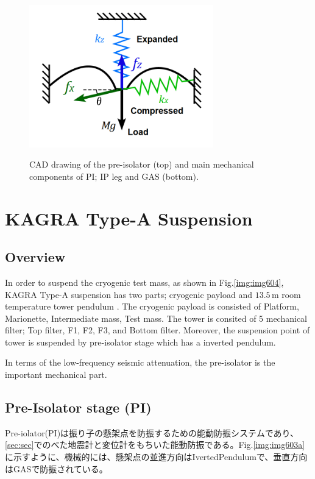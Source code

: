 \begin{figure}[p]
\begin{minipage}[b]{0.5\hsize}
\begin{center}
      \label{img:img603b}
    \end{center}
  \end{minipage}
  \begin{minipage}[b]{0.5\hsize}
    \begin{center}
      \includegraphics[width=8cm]{./img_chap6/img603c.png}
      \label{img:img603b}
    \end{center}
  \end{minipage}  
  \caption{CAD drawing of the pre-isolator (top) and main mechanical components of PI; IP leg and GAS (bottom).}
\end{figure}


\section{KAGRA Type-A Suspension}
\subsection{Overview}
In order to suspend the cryogenic test mass, as shown in Fig.\ref{img:img604}, KAGRA Type-A suspension has two parts; cryogenic payload and $13.5\,\mathrm{m}$ room temperature tower pendulum \cite{Okutomi2019development}. The cryogenic payload is consisted of Platform, Marionette, Intermediate mass, Test mass. The tower is consited of 5 mechanical filter; Top filter, F1, F2, F3, and Bottom filter. Moreover, the suspension point of tower is suspended by pre-isolator stage which has a inverted pendulum.

In terms of the low-frequency seismic attenuation, the pre-isolator is the important mechanical part.



\subsection{Pre-Isolator stage (PI)}
Pre-iolator(PI)は振り子の懸架点を防振するための能動防振システムであり、\cref{sec:sec}でのべた地震計と変位計をもちいた能動防振である。Fig.\ref{img:img603a}に示すように、機械的には、懸架点の並進方向はIvertedPendulumで、垂直方向はGASで防振されている。

